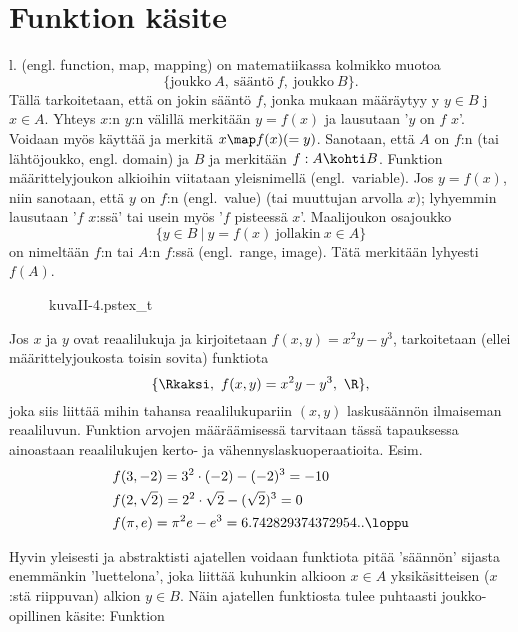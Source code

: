 \section{Funktion käsite} \label{funktio}
\alku

 l.  (engl. function, map, mapping) on matematiikassa kolmikko muotoa
\[
\{\text{joukko} \ A, \ \text{sääntö} \ f, \ \text{joukko} \ B\}.
\]
Tällä tarkoitetaan, että on jokin sääntö $f$, jonka mukaan määräytyy y
$y \in B$ j $x \in A$. Yhteys $x$:n $y$:n välillä merkitään $y=f(x)$ ja
lausutaan '$y$ on $f$ $x$'. Voidaan myös käyttää  ja merkitä 
$x \map f(x) (=y)$. Sanotaan, että $A$ on $f$:n  (tai lähtöjoukko,
engl. domain) ja $B$  ja merkitään $f:A \kohti B$. Funktion määrittelyjoukon
alkioihin viitataan yleisnimellä  (engl.\ variable). Jos $y=f(x)$, niin sanotaan,
että $y$ on $f$:n  (engl.\ value)  (tai muuttujan arvolla $x$);
lyhyemmin lausutaan '$f$ $x$:ssä' tai usein myös '$f$ pisteessä $x$'. Maalijoukon osajoukko
\[
\{y \in B \ | \ y=f(x) \ \text{jollakin} \ x \in A\}
\]
on nimeltään $f$:n  tai $A$:n  $f$:ssä (engl.\ range, image). Tätä 
merkitään lyhyesti $f(A)$.
\begin{figure}[H]
\begin{center}
{kuvaII-4.pstex_t}
\end{center}
\end{figure}
\begin{Exa}
Jos $x$ ja $y$ ovat reaalilukuja ja kirjoitetaan $f(x,y)=x^2y-y^3$, tarkoitetaan (ellei 
määrittelyjoukosta toisin sovita) funktiota
\[
\{ \Rkaksi, \ f(x,y)=x^2y-y^3, \ \R \},
\]
joka siis liittää mihin tahansa reaalilukupariin $(x,y)$ laskusäännön ilmaiseman reaaliluvun.
Funktion arvojen määräämisessä tarvitaan tässä tapauksessa ainoastaan reaalilukujen 
kerto- ja vähennyslaskuoperaatioita. Esim.
\begin{align*}
&f(3,-2)=3^2 \cdot (-2) - (-2)^3 = -10 \\
&f(2,\sqrt{2})=2^2\cdot\sqrt{2}-(\sqrt{2})^3=0 \\
&f(\pi,e)=\pi^2 e - e^3=6.742829374372954.. \loppu
\end{align*}
\end{Exa}
Hyvin yleisesti ja abstraktisti ajatellen voidaan funktiota pitää 'säännön' sijasta enemmänkin
'luettelona', joka liittää kuhunkin alkioon $x \in A$ yksikäsitteisen ($x$:stä riippuvan)
alkion $y \in B$. Näin ajatellen funktiosta tulee puhtaasti joukko-opillinen käsite: Funktion
